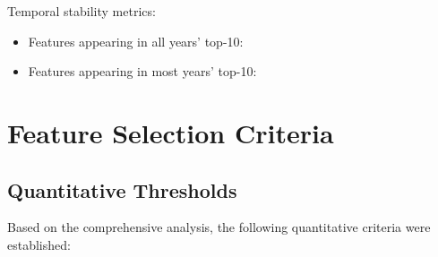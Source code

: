 

Temporal stability metrics:
\begin{itemize}
    \item Features appearing in all years' top-10: \FSFeaturesAllYears
    \item Features appearing in most years' top-10: \FSFeaturesMostYears
\end{itemize}

\section{Feature Selection Criteria}

\subsection{Quantitative Thresholds}

Based on the comprehensive analysis, the following quantitative criteria were established:

